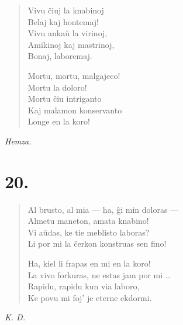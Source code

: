 \begin{verse}
\pstars

\begin{patverse} \vin \vin
Vivu ĉiuj la knabinoj\\
Belaj kaj hontemaj!\\
Vivu ankaŭ la virinoj,\\
Amikinoj kaj mastrinoj,\\
Bonaj, laboremaj.
\end{patverse}

\pstars

\begin{patverse} \vin \vin
Mortu, mortu, malgajeco!\\
Mortu la doloro!\\
Mortu ĉiu intriganto\\
Kaj malamon konservanto\\
Longe en la koro!
\end{patverse}

\end{verse}

\begin{flushright}
\it Hemza. 
\end{flushright}

\begin{center}
\end{center}

\section*{20.}

{\centering{}\par}

\begin{verse}
Al brusto, al mia --- ha, ĝi min doloras --- \\
  \vin   Almetu maneton, amata knabino!\\
Vi aŭdas, ke tie meblisto laboras?\\
  \vin   Li por mi la ĉerkon konstruas sen fino!

\pstars

Ha, kiel li frapas en mi en la koro!\\
\vin     La vivo forkuras, ne estas jam por mi \ldots{}\\
Rapidu, rapidu kun via laboro,\\
  \vin   Ke povu mi foj' je eterne ekdormi.
\end{verse}

\begin{flushright}
\it K. D. 
\end{flushright}

\begin{center}
\end{center}
\titlespacing*{\chapter}{0pt}{0pt}{0pt}


